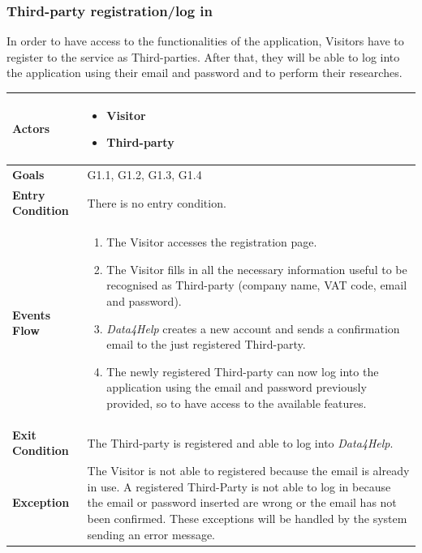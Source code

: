         \subsubsection{Third-party registration/log in}
            In order to have access to the functionalities of the application, Visitors have to register to the service as Third-parties. After that, they will be able to log into the application using their email and password and to perform their researches.
            
            \begin{table}[H]
            	\centering
                \begin{tabular}{|p{3cm}|p{8.2cm}|}
                    \hline
                    \textbf{Actors} &  \begin{itemize}
                        \item Visitor
                        \item Third-party
                    \end{itemize} \\
                     \hline
                    \textbf{Goals} & G1.1, G1.2, G1.3, G1.4 \\ 
                     \hline
                    \textbf{Entry Condition} & There is no entry condition. \\
                     \hline
                    \textbf{Events Flow} & \begin{enumerate}
                        \item The Visitor accesses the registration page.
                        \item The Visitor fills in all the necessary information useful to be recognised as Third-party (company name, VAT code, email and password).
                        \item \emph{Data4Help} creates a new account and sends a confirmation email to the just registered Third-party.
                        \item The newly registered Third-party can now log into the application using the email and password previously provided, so to have access to the available features.
                    \end{enumerate} \\
                     \hline
                    \textbf{Exit Condition} & The Third-party is registered and able to log into \emph{Data4Help}. \\
                     \hline
                    \textbf{Exception} & The Visitor is not able to registered because the email is                      already in use. \newline
                                         A registered Third-Party is not able to log in because the email or password inserted are wrong or the email has not been confirmed. \newline
                                         These exceptions will be handled by the system sending an error message. \\
                     \hline
                \end{tabular}  
            \end{table}
            
